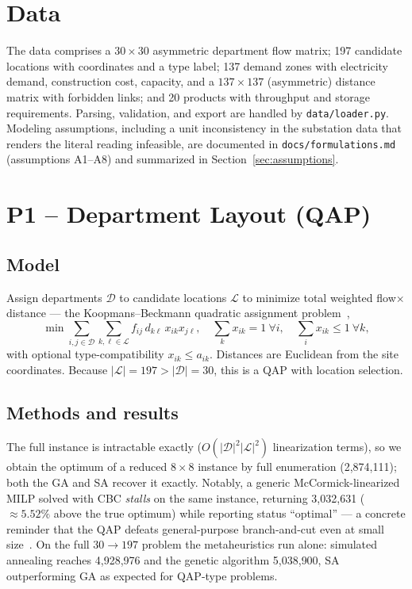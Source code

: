 \documentclass[11pt]{article}
\newcommand{\PoneRedExact}{2{,}874{,}111}  %
\newcommand{\PoneRedMILP}{3{,}032{,}631}   %
\newcommand{\PoneFullSA}{4{,}928{,}976}    %
\newcommand{\PoneFullGA}{5{,}038{,}900}    %
\newcommand{\PoneRedMILPgap}{5.52}         %
\begin{document}
\section{Data}
The data comprises a $30\times30$ asymmetric department flow matrix; 197 candidate
locations with coordinates and a type label; 137 demand zones with electricity
demand, construction cost, capacity, and a $137\times137$ (asymmetric) distance
matrix with forbidden links; and 20 products with throughput and storage
requirements. Parsing, validation, and export are handled by
\texttt{data/loader.py}. Modeling assumptions, including a unit inconsistency in
the substation data that renders the literal reading infeasible, are documented
in \texttt{docs/formulations.md} (assumptions A1--A8) and summarized in
Section~\ref{sec:assumptions}.

\section{P1 -- Department Layout (QAP)}
\subsection{Model}
Assign departments $\mathcal{D}$ to candidate locations $\mathcal{L}$ to minimize
total weighted flow$\times$distance --- the Koopmans--Beckmann quadratic
assignment problem~\cite{koopmans1957assignment,lawler1963quadratic},
\[
\min \sum_{i,j\in\mathcal{D}}\sum_{k,\ell\in\mathcal{L}} f_{ij}\,d_{k\ell}\,x_{ik}x_{j\ell},
\quad \sum_k x_{ik}=1\ \forall i,\quad \sum_i x_{ik}\le 1\ \forall k,
\]
with optional type-compatibility $x_{ik}\le a_{ik}$. Distances are Euclidean from
the site coordinates. Because $|\mathcal{L}|=197>|\mathcal{D}|=30$, this is a QAP
with location selection.

\subsection{Methods and results}
The full instance is intractable exactly ($O(|\mathcal{D}|^2|\mathcal{L}|^2)$
linearization terms), so we obtain the optimum of a reduced $8\times8$ instance by
full enumeration (\PoneRedExact); both the GA and SA recover it exactly. Notably,
a generic McCormick-linearized MILP solved with CBC \emph{stalls} on the same
instance, returning \PoneRedMILP{} ($\approx\PoneRedMILPgap\%$ above the true
optimum) while reporting status ``optimal'' --- a concrete reminder that the QAP
defeats general-purpose branch-and-cut even at small size~\cite{burkard1998qaplib}. On the full
$30\to197$ problem the metaheuristics run alone: simulated annealing reaches
\PoneFullSA{} and the genetic algorithm \PoneFullGA{}, SA outperforming GA as
expected for QAP-type problems.
\end{document}
